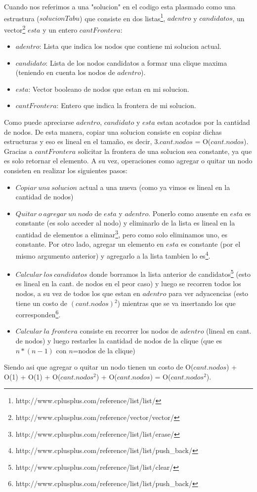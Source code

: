  Cuando nos referimos a una "solucion" en el codigo esta plasmado como una estrustura ($solucionTabu$) que consiste en dos listas\footnote{http://www.cplusplus.com/reference/list/list/}, $adentro$ y $candidatos$, un vector\footnote{http://www.cplusplus.com/reference/vector/vector/} $esta$ y un entero $cantFrontera$:
\begin{itemize}
 \item $adentro$: Lista que indica los nodos que contiene mi solucion actual.
 \item $candidato$: Lista de los nodos candidatos a formar una clique maxima (teniendo en cuenta los nodos de $adentro$). 
 \item $esta$: Vector booleano de nodos que estan en mi solucion.
 \item $cantFrontera$: Entero que indica la frontera de mi solucion.\newline
\end{itemize}
 Como puede apreciarse $adentro$, $candidato$ y $esta$ estan acotados por la cantidad de nodos. De esta manera, copiar una solucion consiste en copiar dichas estructuras y eso es lineal en el tamaño, es decir, 3.$cant.nodos$ = O($cant.nodos$). 
 Gracias a $cantFrontera$ solicitar la frontera de una solucion sea constante, ya que es solo retornar el elemento. A su vez, operaciones como agregar o quitar un nodo consisten en realizar los siguientes pasos: \newline
\begin{itemize}
 \item $Copiar\ una\ solucion$ actual a una nueva (como ya vimos es lineal en la cantidad de nodos)
 \item $Quitar\ o\ agregar\ un\ nodo$ de $esta$ y $adentro$. Ponerlo como ausente en $esta$ es constante (es solo acceder al nodo) y eliminarlo de la lista es lineal en la cantidad de elementos a eliminar\footnote{http://www.cplusplus.com/reference/list/list/erase/}, pero como solo eliminamos uno, es constante. Por otro lado, agregar un elemento en $esta$ es constante (por el mismo argumento anterior) y agregarlo a la lista tambien lo es\footnote{http://www.cplusplus.com/reference/list/list/push_back/}.
 \item $Calcular\ los\ candidatos$ donde borramos la lista anterior de candidatos\footnote{http://www.cplusplus.com/reference/list/list/clear/} (esto es lineal en la cant. de nodos en el peor caso) y luego se recorren todos los nodos, a su vez de todos los que estan en $adentro$ para ver adyacencias (esto tiene un costo de $(cant.nodos)$$^{2}$) mientras que se va insertando los que corresponden\footnote{http://www.cplusplus.com/reference/list/list/push_back/}.
 \item $Calcular\ la\ frontera$ consiste en recorrer los nodos de $adentro$ (lineal en cant. de nodos) y luego restarles la cantidad de nodos de la clique (que es $n*(n-1)$ con $n$=nodos de la clique)
\end{itemize}
 Siendo asi que agregar o quitar un nodo tienen un costo de O($cant.nodos$) + O(1) + O(1) + O($cant.nodos$$^{2}$) + O($cant.nodos$) = O($cant.nodos$$^{2}$).\newline

